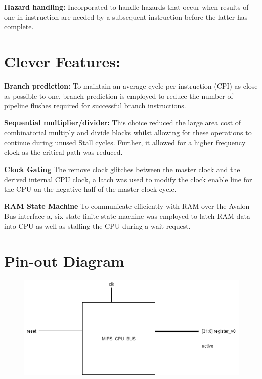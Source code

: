 \documentclass[10pt]{datasheet}
\begin{document}
\textbf{Hazard handling:} Incorporated to handle hazards that occur when results of one in instruction are needed by a subsequent instruction before the latter has complete.

\section{Clever Features:}

\textbf{Branch prediction:} To maintain an average cycle per instruction (CPI) as close as possible to one, branch prediction is employed to reduce the number of pipeline flushes required for successful branch instructions.


\textbf{Sequential multiplier/divider: } This choice reduced the large area cost of combinatorial multiply and divide blocks whilst allowing for these operations to continue during unused Stall cycles. Further, it allowed for a higher frequency clock as the critical path was reduced.



{\textbf{Clock Gating}} 
The remove clock glitches between the master clock and the derived internal CPU clock, a latch was used to modify the clock enable line for the CPU on the negative half of the master clock cycle.

{\textbf{RAM State Machine}}
To communicate efficiently with RAM over the Avalon Bus interface a, six state finite state machine was employed to latch RAM data into CPU as well as stalling the CPU during a wait request.
\smallbreak



\section{Pin-out Diagram}

\smallbreak
\begin{figure}[h]
    \includegraphics[scale=0.35]{Assets/bus.png}
\end{figure}
\end{document}
